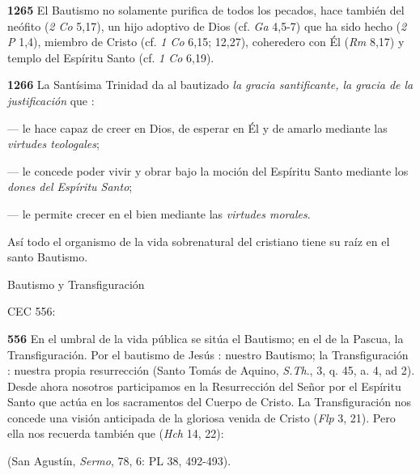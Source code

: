 {\textbf{}

\textbf{1265} El Bautismo no solamente purifica de todos los pecados, hace también del neófito  (\emph{2 Co} 5,17), un hijo adoptivo de Dios (cf. \emph{Ga} 4,5-7) que ha sido hecho  (\emph{2 P} 1,4), miembro de Cristo (cf. \emph{1 Co} 6,15; 12,27), coheredero con Él (\emph{Rm} 8,17) y templo del Espíritu Santo (cf. \emph{1 Co} 6,19).

\textbf{1266} La Santísima Trinidad da al bautizado \emph{la gracia santificante, la gracia de la justificación} que :

--- le hace capaz de creer en Dios, de esperar en Él y de amarlo mediante las \emph{virtudes teologales};

--- le concede poder vivir y obrar bajo la moción del Espíritu Santo mediante los \emph{dones del Espíritu Santo};

--- le permite crecer en el bien mediante las \emph{virtudes morales}.

Así todo el organismo de la vida sobrenatural del cristiano tiene su raíz en el santo Bautismo.

Bautismo y Transfiguración

CEC 556:

\textbf{556} En el umbral de la vida pública se sitúa el Bautismo; en el de la Pascua, la Transfiguración. Por el bautismo de Jesús : nuestro Bautismo; la Transfiguración : nuestra propia resurrección (Santo Tomás de Aquino, \emph{S.Th}., 3, q. 45, a. 4, ad 2). Desde ahora nosotros participamos en la Resurrección del Señor por el Espíritu Santo que actúa en los sacramentos del Cuerpo de Cristo. La Transfiguración nos concede una visión anticipada de la gloriosa venida de Cristo  (\emph{Flp} 3, 21). Pero ella nos recuerda también que  (\emph{Hch} 14, 22):

 (San Agustín, \emph{Sermo}, 78, 6: PL 38, 492-493).

}
